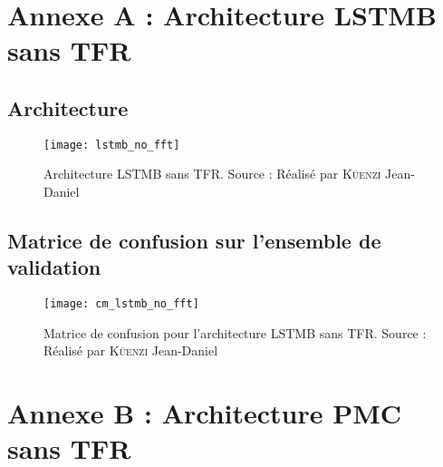


\begin{appendices}
	
\stopcontents[default]
\resumecontents[annexes]
	
\chapter{Annexe A : Architecture LSTMB sans TFR}
\label{app:1}

\section{Architecture}

\begin{figure}[H]
\centering
\texttt{[image: lstmb\_no\_fft]}
\caption[]{Architecture LSTMB sans TFR. Source : Réalisé par \textsc{Küenzi} Jean-Daniel}
\label{fig:lstmb_no_fft}
\end{figure}

\section{Matrice de confusion sur l'ensemble de validation}

\begin{figure}[H]
\centering
\texttt{[image: cm\_lstmb\_no\_fft]}
\caption[]{Matrice de confusion pour l'architecture LSTMB sans TFR. Source : Réalisé par \textsc{Küenzi} Jean-Daniel}
\label{fig:cm_lstmb_no_fft}
\end{figure}	

\chapter{Annexe B : Architecture PMC sans TFR}
\label{app:2}


\end{appendices}
